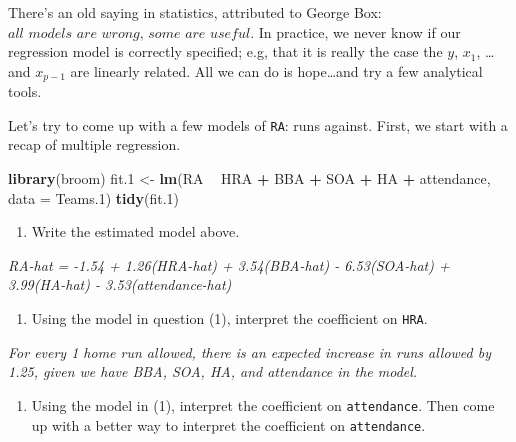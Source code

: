 \documentclass[]{article}
\newenvironment{Shaded}{\begin{snugshade}}{\end{snugshade}}
\newcommand{\DataTypeTok}[1]{\textcolor[rgb]{0.13,0.29,0.53}{#1}}
\newcommand{\FloatTok}[1]{\textcolor[rgb]{0.00,0.00,0.81}{#1}}
\newcommand{\KeywordTok}[1]{\textcolor[rgb]{0.13,0.29,0.53}{\textbf{#1}}}
\newcommand{\NormalTok}[1]{#1}
\newcommand{\OperatorTok}[1]{\textcolor[rgb]{0.81,0.36,0.00}{\textbf{#1}}}
\newcommand{\StringTok}[1]{\textcolor[rgb]{0.31,0.60,0.02}{#1}}
\providecommand{\tightlist}{%
  \setlength{\itemsep}{0pt}\setlength{\parskip}{0pt}}
\begin{document}
There's an old saying in statistics, attributed to George Box:
\(\textit{all models are wrong, some are useful}\). In practice, we
never know if our regression model is correctly specified; e.g, that it
is really the case the \(y\), \(x_1\), \ldots{} and \(x_{p-1}\) are
linearly related. All we can do is hope\ldots{}and try a few analytical
tools.

Let's try to come up with a few models of \texttt{RA}: runs against.
First, we start with a recap of multiple regression.

\begin{Shaded}
\begin{Highlighting}[]
\KeywordTok{library}\NormalTok{(broom)}
\NormalTok{fit}\FloatTok{.1}\NormalTok{ <-}\StringTok{ }\KeywordTok{lm}\NormalTok{(RA }\OperatorTok{~}\StringTok{ }\NormalTok{HRA }\OperatorTok{+}\StringTok{ }\NormalTok{BBA }\OperatorTok{+}\StringTok{ }\NormalTok{SOA }\OperatorTok{+}\StringTok{ }\NormalTok{HA }\OperatorTok{+}\StringTok{ }\NormalTok{attendance, }\DataTypeTok{data =}\NormalTok{ Teams}\FloatTok{.1}\NormalTok{)}
\KeywordTok{tidy}\NormalTok{(fit}\FloatTok{.1}\NormalTok{)}
\end{Highlighting}
\end{Shaded}

\begin{enumerate}
\def\labelenumi{\arabic{enumi}.}
\tightlist
\item
  Write the estimated model above.
\end{enumerate}

\emph{RA-hat = -1.54 + 1.26(HRA-hat) + 3.54(BBA-hat) - 6.53(SOA-hat) +
3.99(HA-hat) - 3.53(attendance-hat)}

\begin{enumerate}
\def\labelenumi{\arabic{enumi}.}
\setcounter{enumi}{1}
\tightlist
\item
  Using the model in question (1), interpret the coefficient on
  \texttt{HRA}.
\end{enumerate}

\emph{For every 1 home run allowed, there is an expected increase in
runs allowed by 1.25, given we have BBA, SOA, HA, and attendance in the
model.}

\begin{enumerate}
\def\labelenumi{\arabic{enumi}.}
\setcounter{enumi}{2}
\tightlist
\item
  Using the model in (1), interpret the coefficient on
  \texttt{attendance}. Then come up with a better way to interpret the
  coefficient on \texttt{attendance}.
\end{enumerate}
\end{document}
